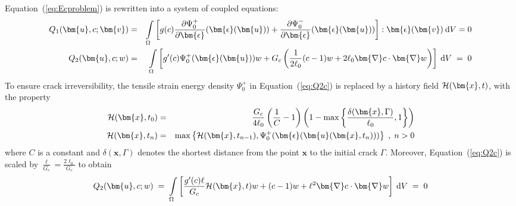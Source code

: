 \documentclass{article}
\def\deriv#1#2{\frac{\partial#1}{\partial#2}}
\def\dV{\:{\rm d}V}
\begin{document}
Equation~(\ref{eq:Ecproblem}) is rewritten into a system of coupled equations:
%
\begin{eqnarray}
  \label{eq:Q1c}
  Q_1(\bm{u},c;\bm{v}) &=& \int\limits_\Omega \left[
    g(c)\deriv{\Psi_0^+}{\bm{\epsilon}}(\bm{\epsilon}(\bm{u})) +
        \deriv{\Psi_0^-}{\bm{\epsilon}}(\bm{\epsilon}(\bm{u}))
    \right] : \bm{\epsilon}(\bm{v})\dV = 0 \\
  \label{eq:Q2c}
  Q_2(\bm{u},c;w) &=& \int\limits_\Omega \left[
    g'(c)\Psi_0^+(\bm{\epsilon}(\bm{u}))w + G_c\left(
    \frac{1}{2\ell_0}(c-1)w + 2\ell_0\bm{\nabla}c\cdot\bm{\nabla}w
    \right)\right] \dV \;=\; 0
\end{eqnarray}
%
To ensure crack irreversibility, the tensile strain energy density $\Psi_0^+$
in Equation~(\ref{eq:Q2c}) is replaced by a history field ${\cal H}(\bm{x},t)$,
with the property
%
\begin{eqnarray}
  \label{eq:initial-crack}
  {\cal H}(\bm{x},t_0) &=& \frac{G_c}{4\ell_0}\left(\frac{1}{C}-1\right)
  \left(1-\max\left\{\frac{\delta(\bm{x},\Gamma)}{\ell_0},1\right\}\right) \\
  \label{eq:history-field}
  {\cal H}(\bm{x},t_n) &=& \max\left\{{\cal H}(\bm{x},t_{n-1}),
  \Psi_0^+(\bm{\epsilon}(\bm{u}(\bm{x},t_n)))\right\}\;,\; n > 0
\end{eqnarray}
%
where $C$ is a constant and $\delta(\bm{x},\Gamma)$ denotes the shortest
distance from the point $\bm{x}$ to the initial crack $\Gamma$.
Moreover, Equation~(\ref{eq:Q2c}) is scaled by
$\frac{\ell}{G_c}=\frac{2\ell_0}{G_c}$ to obtain
%
\begin{equation}
\label{eq:Q2c-mod}
  Q_2(\bm{u},c;w) \;=\; \int\limits_\Omega \left[
    \frac{g'(c)\ell}{G_c}{\cal H}(\bm{x},t)w +
    (c-1)w + \ell^2\bm{\nabla}c\cdot\bm{\nabla}w \right] \dV \;=\; 0
\end{equation}
\end{document}
